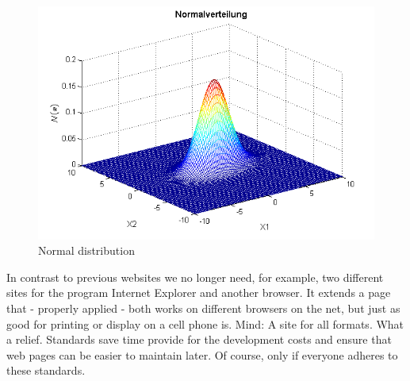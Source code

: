 \begin{figure}[H]
	\centering
		\includegraphics[scale=0.7]{images/multivariate_gauss.png}
	\caption{Normal distribution}
	\label{fig:normal_distribution}
\end{figure}

In contrast to previous websites we no longer need, for example, two different sites for the program Internet Explorer and another browser. It extends a page that - properly applied - both works on different browsers on the net, but just as good for printing or display on a cell phone is. Mind: A site for all formats. What a relief. Standards save time provide for the development costs and ensure that web pages can be easier to maintain later. Of course, only if everyone adheres to these standards.
